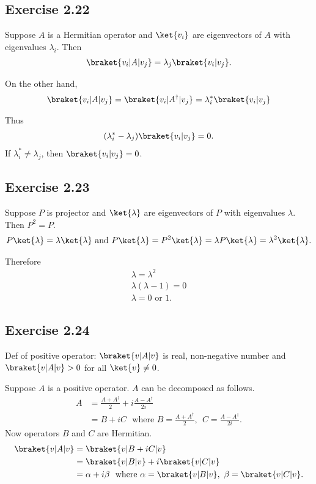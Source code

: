 \documentclass[a4paper,12pt]{article}
\begin{document}
\subsection*{Exercise 2.22}
Suppose $A$ is a Hermitian operator and $\ket{v_i}$ are eigenvectors of $A$ with eigenvalues $\lambda_i$.
Then
\begin{align*}
	\braket{v_i | A | v_j} = \lambda_j \braket{v_i | v_j}.
\end{align*}

On the other hand,
\begin{align*}
	\braket{v_i | A | v_j} = \braket{v_i | A^\dagger | v_j}
	=  \lambda_i^* \braket{v_i | v_j}
\end{align*}

Thus
\begin{align*}
	(\lambda_i^* - \lambda_j) \braket{v_i | v_j}  = 0.
\end{align*}
If $\lambda_i^* \neq \lambda_j$, then $\braket{v_i | v_j}  = 0$.


\subsection*{Exercise 2.23}
Suppose $P$ is projector and $\ket{\lambda}$  are eigenvectors of $P$ with eigenvalues $\lambda$.
Then $P^2 = P$.
\begin{align*}
	P \ket{\lambda} = \lambda \ket{\lambda} \text{ and }	P \ket{\lambda} = P^2 \ket{\lambda} = \lambda  P \ket{\lambda} = \lambda^2 \ket{\lambda}.
\end{align*}

Therefore
\begin{align*}
	\lambda = \lambda^2\\
	\lambda (\lambda - 1) = 0\\
	\lambda = 0 \text{ or } 1.
\end{align*}


\subsection*{Exercise 2.24}
Def of positive operator: $\braket{v | A | v}$ is real, non-negative number and $\braket{v | A | v} > 0$ for all $\ket{v}\neq 0$.

Suppose $A$ is a positive operator. $A$ can be decomposed as follows.
\begin{align*}
	A &= \frac{A + A^\dagger}{2} + i \frac{A - A^\dagger}{2i}\\
		&= B + i C  ~~~\text{where } B =\frac{A + A^\dagger}{2}, ~~  C = \frac{A - A^\dagger}{2i}.
\end{align*}
Now operators $B$ and $C$ are Hermitian.
\begin{align*}
	\braket{v | A | v}  &= \braket{v | B + iC | v}\\
		&= \braket{v | B | v}  + i \braket{v | C | v}\\
		&= \alpha + i \beta ~~ \text{where } \alpha = \braket{v | B | v}, ~\beta = \braket{v | C | v}.
\end{align*}
\end{document}
